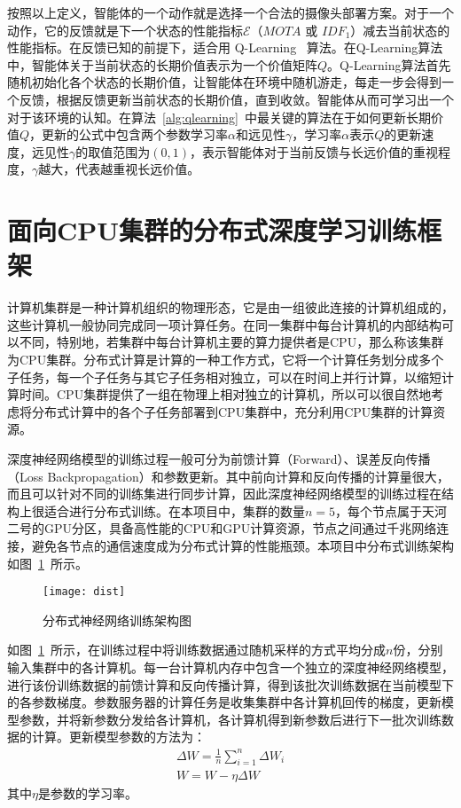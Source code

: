 按照以上定义，智能体的一个动作就是选择一个合法的摄像头部署方案。对于一个动作，它的反馈就是下一个状态的性能指标$\mathcal{E}$（$\mathit{MOTA}$ 或 $\mathit{IDF_1}$）减去当前状态的性能指标。在反馈已知的前提下，适合用 Q-Learning~\cite{watkins1989learning} 算法。在Q-Learning算法中，智能体关于当前状态的长期价值表示为一个价值矩阵$Q$。Q-Learning算法首先随机初始化各个状态的长期价值，让智能体在环境中随机游走，每走一步会得到一个反馈，根据反馈更新当前状态的长期价值，直到收敛。智能体从而可学习出一个对于该环境的认知。在算法~\ref{alg:qlearning}~中最关键的算法在于如何更新长期价值$Q$，更新的公式中包含两个参数学习率$\alpha$和远见性$\gamma$，学习率$\alpha$表示$Q$的更新速度，远见性$\gamma$的取值范围为$(0, 1)$，表示智能体对于当前反馈与长远价值的重视程度，$\gamma$越大，代表越重视长远价值。

\section{面向CPU集群的分布式深度学习训练框架}

计算机集群是一种计算机组织的物理形态，它是由一组彼此连接的计算机组成的，这些计算机一般协同完成同一项计算任务。在同一集群中每台计算机的内部结构可以不同，特别地，若集群中每台计算机主要的算力提供者是CPU，那么称该集群为CPU集群。分布式计算是计算的一种工作方式，它将一个计算任务划分成多个子任务，每一个子任务与其它子任务相对独立，可以在时间上并行计算，以缩短计算时间。CPU集群提供了一组在物理上相对独立的计算机，所以可以很自然地考虑将分布式计算中的各个子任务部署到CPU集群中，充分利用CPU集群的计算资源。

深度神经网络模型的训练过程一般可分为前馈计算（Forward）、误差反向传播（Loss Backpropagation）和参数更新。其中前向计算和反向传播的计算量很大，而且可以针对不同的训练集进行同步计算，因此深度神经网络模型的训练过程在结构上很适合进行分布式训练。在本项目中，集群的数量$n=5$，每个节点属于天河二号的GPU分区，具备高性能的CPU和GPU计算资源，节点之间通过千兆网络连接，避免各节点的通信速度成为分布式计算的性能瓶颈。本项目中分布式训练架构如图~\ref{fig:dist}~所示。

\begin{figure}[!ht]
\centering
\texttt{[image: dist]}
\caption{分布式神经网络训练架构图}
\label{fig:dist}
\end{figure}

如图~\ref{fig:dist}~所示，在训练过程中将训练数据通过随机采样的方式平均分成$n$份，分别输入集群中的各计算机。每一台计算机内存中包含一个独立的深度神经网络模型，进行该份训练数据的前馈计算和反向传播计算，得到该批次训练数据在当前模型下的各参数梯度。参数服务器的计算任务是收集集群中各计算机回传的梯度，更新模型参数，并将新参数分发给各计算机，各计算机得到新参数后进行下一批次训练数据的计算。更新模型参数的方法为：
\begin{eqnarray}
\Delta W=\frac{1}{n}\sum_{i = 1}^{n}\Delta W_i \\
W=W-\eta\Delta W
\end{eqnarray}
其中$\eta$是参数的学习率。